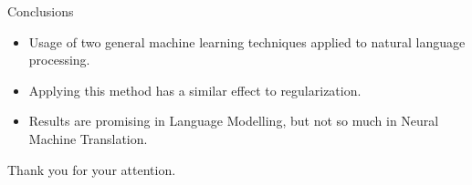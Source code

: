 \documentclass[aspectratio=169]{beamer}
\begin{document}
  
  \begin{frame}{Conclusions}

    \begin{itemize}
      \item Usage of two general machine learning techniques applied to natural language processing.
      \item Applying this method has a similar effect to regularization.
      \item Results are promising in Language Modelling, but not so much in Neural Machine Translation.
    \end{itemize}
  \end{frame}
  
  \appendix

  \begin{frame}
    Thank you for your attention.
  \end{frame}


  \begin{frame}[noframenumbering]

  \vspace{0.5cm}
  
  

  \end{frame}
\end{document}
